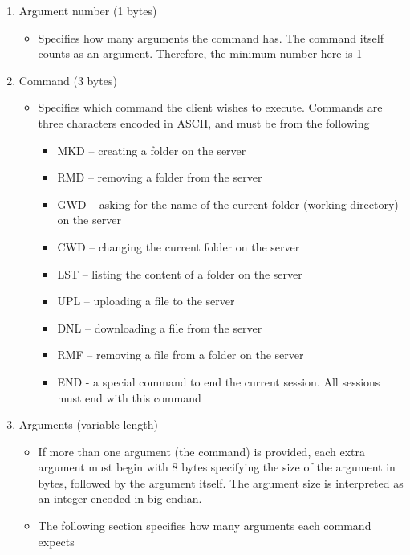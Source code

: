 \documentclass[12pt]{article}
\begin{document}
\begin{enumerate}
    \item Argument number (1 bytes)
    \begin{itemize}
        \item Specifies how many arguments the command has. The command itself counts as an argument. Therefore, the minimum number here is 1
    \end{itemize}
    \item Command (3 bytes)
    \begin{itemize}
        \item Specifies which command the client wishes to execute. Commands are three characters encoded in ASCII, and must be from the following
        \begin{itemize}
            \item MKD – creating a folder on the server
            \item RMD – removing a folder from the server
            \item GWD – asking for the name of the current folder (working directory) on the server
            \item CWD – changing the current folder on the server
            \item LST – listing the content of a folder on the server
            \item UPL – uploading a file to the server
            \item DNL – downloading a file from the server
            \item RMF – removing a file from a folder on the server
            \item END - a special command to end the current session. All sessions must end with this command
        \end{itemize}
    \end{itemize}
    \item Arguments (variable length)
    \begin{itemize}
        \item If more than one argument (the command) is provided, each extra argument must begin with 8 bytes specifying the size of the argument in bytes, followed by the argument itself. The argument size is interpreted as an integer encoded in big endian. 
        \item The following section specifies how many arguments each command expects
    \end{itemize}
\end{enumerate}
\end{document}
